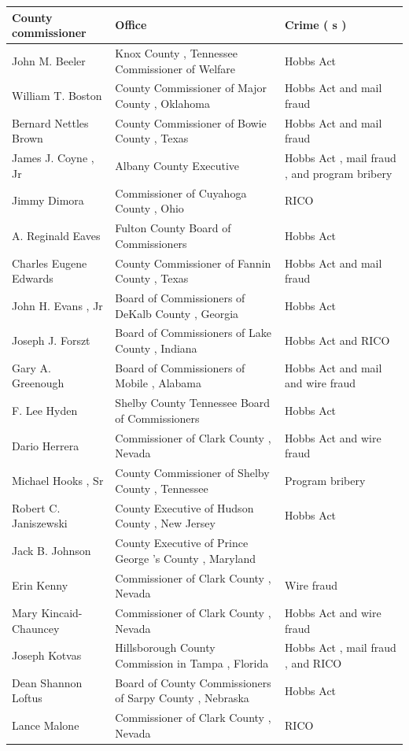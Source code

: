 \documentclass{article}
\begin{document}
\begin{tabular}{lll}
\toprule
County commissioner & Office & Crime ( s ) \\
\midrule
John M. Beeler & Knox County , Tennessee Commissioner of Welfare & Hobbs Act \\
William T. Boston & County Commissioner of Major County , Oklahoma & Hobbs Act and mail fraud \\
Bernard Nettles Brown & County Commissioner of Bowie County , Texas & Hobbs Act and mail fraud \\
James J. Coyne , Jr & Albany County Executive & Hobbs Act , mail fraud , and program bribery \\
Jimmy Dimora & Commissioner of Cuyahoga County , Ohio & RICO \\
A. Reginald Eaves & Fulton County Board of Commissioners & Hobbs Act \\
Charles Eugene Edwards & County Commissioner of Fannin County , Texas & Hobbs Act and mail fraud \\
John H. Evans , Jr & Board of Commissioners of DeKalb County , Georgia & Hobbs Act \\
Joseph J. Forszt & Board of Commissioners of Lake County , Indiana & Hobbs Act and RICO \\
Gary A. Greenough & Board of Commissioners of Mobile , Alabama & Hobbs Act and mail and wire fraud \\
F. Lee Hyden & Shelby County Tennessee Board of Commissioners & Hobbs Act \\
Dario Herrera & Commissioner of Clark County , Nevada & Hobbs Act and wire fraud \\
Michael Hooks , Sr & County Commissioner of Shelby County , Tennessee & Program bribery \\
Robert C. Janiszewski & County Executive of Hudson County , New Jersey & Hobbs Act \\
Jack B. Johnson & County Executive of Prince George 's County , Maryland &  \\
Erin Kenny & Commissioner of Clark County , Nevada & Wire fraud \\
Mary Kincaid-Chauncey & Commissioner of Clark County , Nevada & Hobbs Act and wire fraud \\
Joseph Kotvas & Hillsborough County Commission in Tampa , Florida & Hobbs Act , mail fraud , and RICO \\
Dean Shannon Loftus & Board of County Commissioners of Sarpy County , Nebraska & Hobbs Act \\
Lance Malone & Commissioner of Clark County , Nevada & RICO \\
\bottomrule
\end{tabular}
\end{document}
